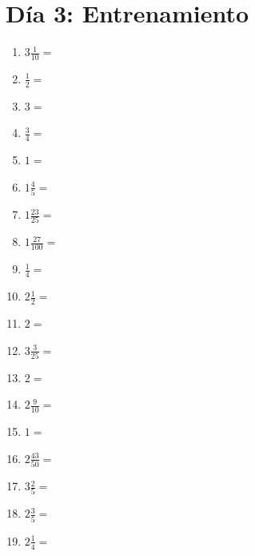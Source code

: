 \documentclass[12pt]{article}
\begin{document}
\section*{Día 3: Entrenamiento}
\begin{enumerate}
\item \large $ 3 \frac{1}{10} = $ \vspace{1.5cm}
\item \large $ \frac{1}{2} = $ \vspace{1.5cm}
\item \large $ 3 = $ \vspace{1.5cm}
\item \large $ \frac{3}{4} = $ \vspace{1.5cm}
\item \large $ 1 = $ \vspace{1.5cm}
\item \large $ 1 \frac{4}{5} = $ \vspace{1.5cm}
\item \large $ 1 \frac{23}{25} = $ \vspace{1.5cm}
\item \large $ 1 \frac{27}{100} = $ \vspace{1.5cm}
\item \large $ \frac{1}{4} = $ \vspace{1.5cm}
\item \large $ 2 \frac{1}{2} = $ \vspace{1.5cm}
\newpage
\item \large $ 2 = $ \vspace{1.5cm}
\item \large $ 3 \frac{3}{25} = $ \vspace{1.5cm}
\item \large $ 2 = $ \vspace{1.5cm}
\item \large $ 2 \frac{9}{10} = $ \vspace{1.5cm}
\item \large $ 1 = $ \vspace{1.5cm}
\item \large $ 2 \frac{43}{50} = $ \vspace{1.5cm}
\item \large $ 3 \frac{2}{5} = $ \vspace{1.5cm}
\item \large $ 2 \frac{3}{5} = $ \vspace{1.5cm}
\item \large $ 2 \frac{1}{4} = $ \vspace{1.5cm}

\end{enumerate}
\end{document}
